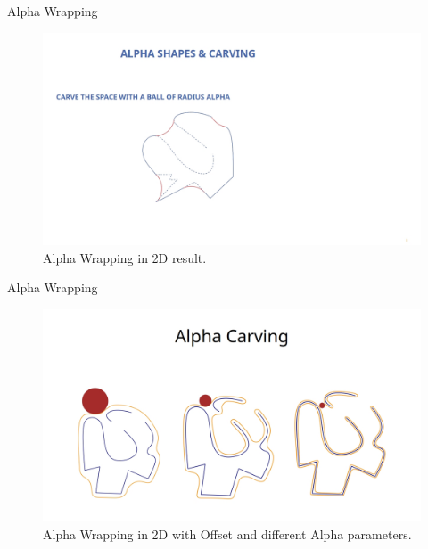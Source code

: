 \documentclass[10pt]{beamer}
\begin{document}
\begin{frame}{Alpha Wrapping}
  \begin{figure}[H]
    \centering
    \includegraphics[width=1.1\textwidth]{images/alpha-wrapping2.jpg}
    \caption{Alpha Wrapping in 2D result.}
\end{figure}
\end{frame}

\begin{frame}{Alpha Wrapping}
  \begin{figure}[H]
    \centering
    \includegraphics[width=1.1\textwidth]{images/alpha-wrapping3.jpg}
    \caption{Alpha Wrapping in 2D with Offset and different Alpha parameters.}
\end{figure}
\end{frame}
\end{document}
